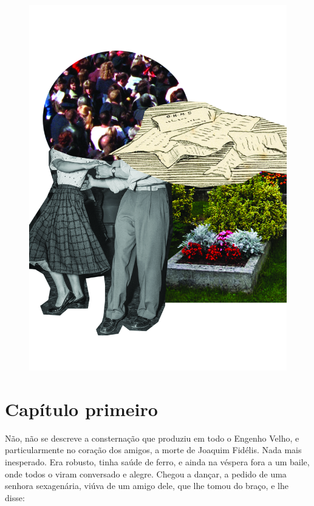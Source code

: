 \pagebreak
\thispagestyle{empty}
\begin{figure}
\includegraphics[width=\textwidth]{./ilustracoes/07_GALERIA.jpg}
\end{figure}
\pagebreak


\section{Capítulo primeiro}

Não, não se descreve a consternação que produziu em todo o Engenho
Velho, e particularmente no coração dos amigos, a morte de Joaquim
Fidélis. Nada mais inesperado. Era robusto, tinha saúde de ferro, e
ainda na véspera fora a um baile, onde todos o viram conversado e
alegre. Chegou a dançar, a pedido de uma senhora sexagenária, viúva de
um amigo dele, que lhe tomou do braço, e lhe disse:

